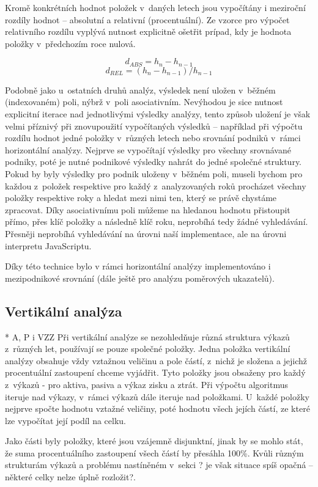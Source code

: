 Kromě konkrétních hodnot položek v~daných letech jsou vypočítány i meziroční rozdíly hodnot -- absolutní a relativní (procentuální). Ze vzorce pro výpočet relativního rozdílu vyplývá nutnost explicitně ošetřit prípad, kdy je hodnota položky v~předchozím roce nulová.

$$d_{ABS}=h_{n}-h_{n-1}$$
$$d_{REL}=(h_{n}-h_{n-1})/h_{n-1}$$


Podobně jako u~ostatních druhů analýz, výsledek není uložen v~běžném (indexovaném) poli, nýbrž v~poli asociativním. Nevýhodou je sice nutnost explicitní iterace nad jednotlivými výsledky analýzy, tento způsob uložení je však velmi příznivý při znovupoužití vypočítaných výsledků -- například při výpočtu rozdílu hodnot jedné položky v~různých letech nebo srovnání podniků v~rámci horizontální analýzy. Nejprve se vypočítají výsledky pro všechny srovnávané podniky, poté je nutné podnikové výsledky nahrát do jedné společné struktury. Pokud by byly výsledky pro podnik uloženy v~běžném poli, museli bychom pro každou z~položek respektive pro každý z~analyzovaných roků procházet všechny položky respektive roky a hledat mezi nimi ten, který se právě chystáme zpracovat. Díky asociativnímu poli můžeme na hledanou hodnotu přistoupit přímo, přes klíč položky a následně klíč roku, neprobíhá tedy žádné vyhledávání. Přesněji neprobíhá vyhledávání na úrovni naší implementace, ale na úrovni interpretu JavaScriptu.

Díky této technice bylo v rámci horizontální analýzy implementováno i mezipodnikové srovnání (dále ještě pro analýzu poměrových ukazatelů).

\subsection{Vertikální analýza}
* A, P i VZZ
Při vertikální analýze se nezohledňuje různá struktura výkazů z~různých let, používají se pouze společné položky. Jedna položka vertikální analýzy obsahuje vždy vztažnou veličinu a pole částí, z~nichž je složena a jejichž procentuální zastoupení chceme vyjádřit. Tyto položky jsou obsaženy pro každý z~výkazů - pro aktiva, pasiva a výkaz zisku a ztrát. Při výpočtu algoritmus iteruje nad výkazy, v~rámci výkazů dále iteruje nad položkami. U~každé položky nejprve spočte hodnotu vztažné veličiny, poté hodnotu všech jejích částí, ze které lze vypočítat její podíl na celku.

Jako části byly položky, které jsou vzájemně disjunktní, jinak by se mohlo stát, že suma procentuálního zastoupení všech částí by přesáhla 100\%. Kvůli různým strukturám výkazů a problému nastíněném v~sekci ? je však situace spíš opačná -- některé celky nelze úplně rozložit?.

